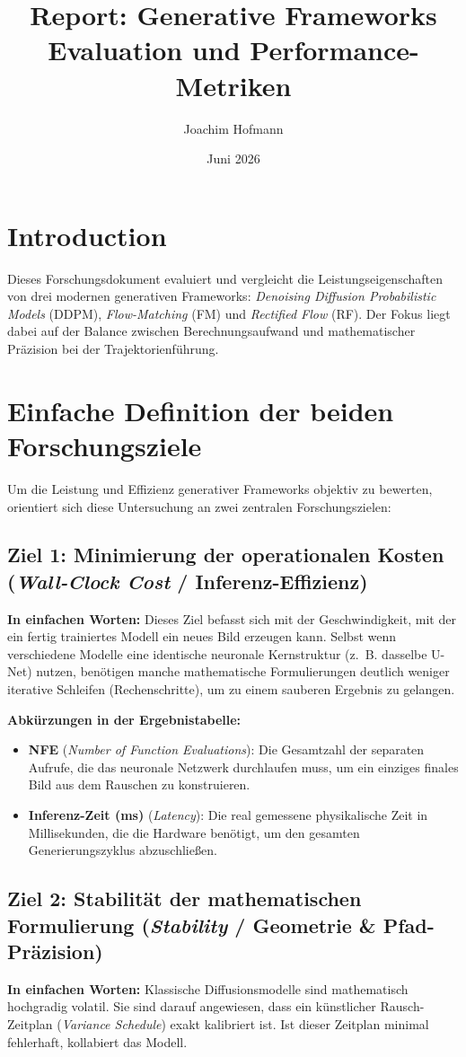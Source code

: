 \documentclass[11pt,a4paper]{article}
\title{\textbf{Report: Generative Frameworks \\ Evaluation und Performance-Metriken}}
\author{Joachim Hofmann}
\date{Juni 2026}
\begin{document}
\maketitle

\section{Introduction}
Dieses Forschungsdokument evaluiert und vergleicht die Leistungseigenschaften von drei modernen generativen Frameworks: \textit{Denoising Diffusion Probabilistic Models} (DDPM), \textit{Flow-Matching} (FM) und \textit{Rectified Flow} (RF). Der Fokus liegt dabei auf der Balance zwischen Berechnungsaufwand und mathematischer Präzision bei der Trajektorienführung.

\section{Einfache Definition der beiden Forschungsziele}
Um die Leistung und Effizienz generativer Frameworks objektiv zu bewerten, orientiert sich diese Untersuchung an zwei zentralen Forschungszielen:

\subsection{Ziel 1: Minimierung der operationalen Kosten (\textit{Wall-Clock Cost} / Inferenz-Effizienz)}
\textbf{In einfachen Worten:} Dieses Ziel befasst sich mit der Geschwindigkeit, mit der ein fertig trainiertes Modell ein neues Bild erzeugen kann. Selbst wenn verschiedene Modelle eine identische neuronale Kernstruktur (z.~B. dasselbe U-Net) nutzen, benötigen manche mathematische Formulierungen deutlich weniger iterative Schleifen (Rechenschritte), um zu einem sauberen Ergebnis zu gelangen.

\textbf{Abkürzungen in der Ergebnistabelle:}
\begin{itemize}
    \item \textbf{NFE} (\textit{Number of Function Evaluations}): Die Gesamtzahl der separaten Aufrufe, die das neuronale Netzwerk durchlaufen muss, um ein einziges finales Bild aus dem Rauschen zu konstruieren.
    \item \textbf{Inferenz-Zeit (ms)} (\textit{Latency}): Die real gemessene physikalische Zeit in Millisekunden, die die Hardware benötigt, um den gesamten Generierungszyklus abzuschließen.
\end{itemize}

\subsection{Ziel 2: Stabilität der mathematischen Formulierung (\textit{Stability} / Geometrie \& Pfad-Präzision)}
\textbf{In einfachen Worten:} Klassische Diffusionsmodelle sind mathematisch hochgradig volatil. Sie sind darauf angewiesen, dass ein künstlicher Rausch-Zeitplan (\textit{Variance Schedule}) exakt kalibriert ist. Ist dieser Zeitplan minimal fehlerhaft, kollabiert das Modell. 
\end{document}
